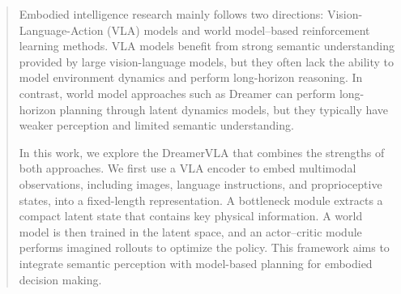 \begin{abstract}
Embodied intelligence research mainly follows two directions: Vision-Language-Action (VLA) models and world model–based reinforcement learning methods. VLA models benefit from strong semantic understanding provided by large vision-language models, but they often lack the ability to model environment dynamics and perform long-horizon reasoning. In contrast, world model approaches such as Dreamer can perform long-horizon planning through latent dynamics models, but they typically have weaker perception and limited semantic understanding.

In this work, we explore the DreamerVLA that combines the strengths of both approaches. We first use a VLA encoder to embed multimodal observations, including images, language instructions, and proprioceptive states, into a fixed-length representation. A bottleneck module extracts a compact latent state that contains key physical information. A world model is then trained in the latent space, and an actor–critic module performs imagined rollouts to optimize the policy. This framework aims to integrate semantic perception with model-based planning for embodied decision making.
\end{abstract}